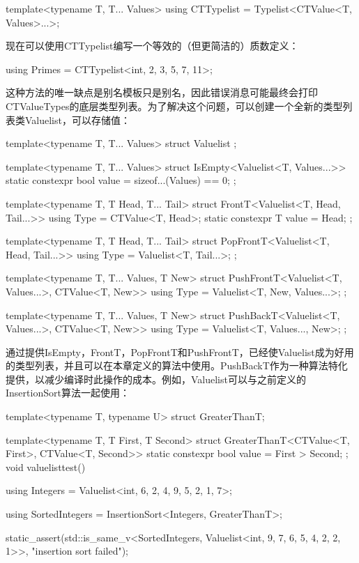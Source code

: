 \begin{cpp}
template<typename T, T... Values>
using CTTypelist = Typelist<CTValue<T, Values>...>;
\end{cpp}

现在可以使用CTTypelist编写一个等效的（但更简洁的）质数定义：

\begin{cpp}
using Primes = CTTypelist<int, 2, 3, 5, 7, 11>;
\end{cpp}

这种方法的唯一缺点是别名模板只是别名，因此错误消息可能最终会打印CTValueTypes的底层类型列表。为了解决这个问题，可以创建一个全新的类型列表类Valuelist，可以存储值：

\begin{cpp}
template<typename T, T... Values>
struct Valuelist {};

template<typename T, T... Values>
struct IsEmpty<Valuelist<T, Values...>> {
	static constexpr bool value = sizeof...(Values) == 0;
};

template<typename T, T Head, T... Tail>
struct FrontT<Valuelist<T, Head, Tail...>> {
	using Type = CTValue<T, Head>;
	static constexpr T value = Head;
};

template<typename T, T Head, T... Tail>
struct PopFrontT<Valuelist<T, Head, Tail...>> {
	using Type = Valuelist<T, Tail...>;
};

template<typename T, T... Values, T New>
struct PushFrontT<Valuelist<T, Values...>, CTValue<T, New>> {
	using Type = Valuelist<T, New, Values...>;
};

template<typename T, T... Values, T New>
struct PushBackT<Valuelist<T, Values...>, CTValue<T, New>> {
	using Type = Valuelist<T, Values..., New>;
};
\end{cpp}

通过提供IsEmpty，FrontT，PopFrontT和PushFrontT，已经使Valuelist成为好用的类型列表，并且可以在本章定义的算法中使用。PushBackT作为一种算法特化提供，以减少编译时此操作的成本。例如，Valuelist可以与之前定义的InsertionSort算法一起使用：

\begin{cpp}
template<typename T, typename U>
struct GreaterThanT;

template<typename T, T First, T Second>
struct GreaterThanT<CTValue<T, First>, CTValue<T, Second>> {
	static constexpr bool value = First > Second;
};
void valuelisttest() {
	using Integers = Valuelist<int, 6, 2, 4, 9, 5, 2, 1, 7>;
	
	using SortedIntegers = InsertionSort<Integers, GreaterThanT>;
	
	static_assert(std::is_same_v<SortedIntegers,
								Valuelist<int, 9, 7, 6, 5, 4, 2, 2, 1>>,
				"insertion sort failed");
}
\end{cpp}

